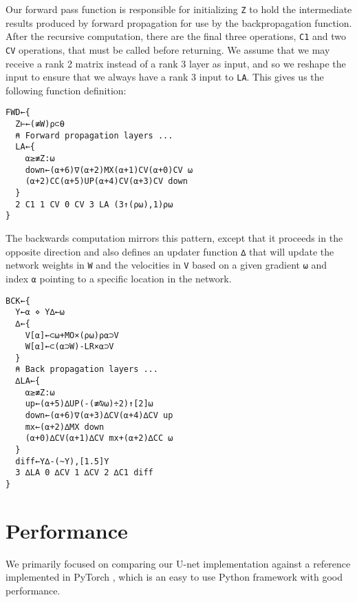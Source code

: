 \documentclass[10pt,twocolumn,english,format=sigplan,screen,balance]{acmart}
\begin{document}
Our forward pass function is responsible for initializing \texttt{Z}
to hold the intermediate results produced by forward propagation for
use by the backpropagation function. After the recursive computation,
there are the final three operations, \texttt{C1} and two \texttt{CV}
operations, that must be called before returning. We assume that we
may receive a rank 2 matrix instead of a rank 3 layer as input, and
so we reshape the input to ensure that we always have a rank 3 input
to \texttt{LA}. This gives us the following function definition:
\begin{verbatim}
FWD←{
  Z⊢←(≢W)⍴⊂⍬
  ⍝ Forward propagation layers ...
  LA←{
    ⍺≥≢Z:⍵
    down←(⍺+6)∇(⍺+2)MX(⍺+1)CV(⍺+0)CV ⍵
    (⍺+2)CC(⍺+5)UP(⍺+4)CV(⍺+3)CV down
  }
  2 C1 1 CV 0 CV 3 LA (3↑(⍴⍵),1)⍴⍵
}
\end{verbatim}
The backwards computation mirrors this pattern, except that it proceeds
in the opposite direction and also defines an updater function \texttt{∆}
that will update the network weights in \texttt{W} and the velocities
in \texttt{V} based on a given gradient \texttt{⍵} and index \texttt{⍺}
pointing to a specific location in the network. 
\begin{verbatim}
BCK←{
  Y←⍺ ⋄ Y∆←⍵
  ∆←{
    V[⍺]←⊂⍵+MO×(⍴⍵)⍴⍺⊃V
    W[⍺]←⊂(⍺⊃W)-LR×⍺⊃V
  }
  ⍝ Back propagation layers ...
  ∆LA←{
    ⍺≥≢Z:⍵
    up←(⍺+5)∆UP(-(≢⍉⍵)÷2)↑[2]⍵
    down←(⍺+6)∇(⍺+3)∆CV(⍺+4)∆CV up
    mx←(⍺+2)∆MX down
    (⍺+0)∆CV(⍺+1)∆CV mx+(⍺+2)∆CC ⍵
  }
  diff←Y∆-(~Y),[1.5]Y
  3 ∆LA 0 ∆CV 1 ∆CV 2 ∆C1 diff
}
\end{verbatim}

\section{Performance}

We primarily focused on comparing our U-net implementation against
a reference implemented in PyTorch \citep{pytorch}, which is an easy
to use Python framework with good performance. 
\end{document}
